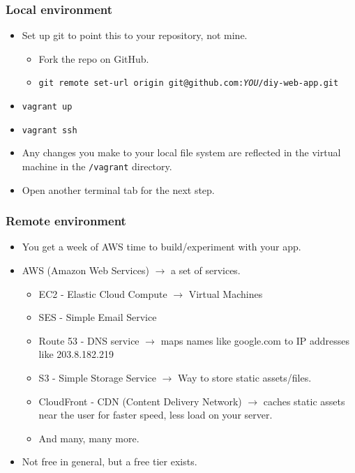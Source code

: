 \documentclass{beamer}
\begin{document}
\begin{frame}
  \frametitle{Local environment}
  \begin{itemize}
  \item Set up git to point this to your repository, not mine.
    \begin{itemize}
    \item Fork the repo on GitHub.
    \item \texttt{git remote set-url origin git@github.com:\textit{YOU}/diy-web-app.git}
    \end{itemize}
  \item \texttt{vagrant up}
  \item \texttt{vagrant ssh}
  \item Any changes you make to your local file system are reflected in the virtual machine in the \texttt{/vagrant} directory.
  \item Open another terminal tab for the next step.
  \end{itemize}
\end{frame}

\begin{frame}
  \frametitle{Remote environment}
  
  \begin{itemize}
  \item You get a week of AWS time to build/experiment with your app.
  \item AWS (Amazon Web Services) $\to$ a set of services.
    \begin{itemize}
    \item EC2 - Elastic Cloud Compute $\to$ Virtual Machines
    \item SES - Simple Email Service
    \item Route 53 - DNS service $\to$ maps names like google.com to
      IP addresses like 203.8.182.219
    \item S3 - Simple Storage Service $\to$ Way to store static assets/files.
    \item CloudFront - CDN (Content Delivery Network) $\to$ caches
      static assets near the user for faster speed, less load on your
      server.
    \item And many, many more.
    \end{itemize}
  \item Not free in general, but a free tier exists.
  \end{itemize}
\end{frame}
\end{document}
